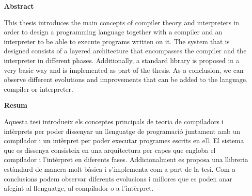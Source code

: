 {}
\centerline{\textbf{Abstract}}
This thesis introduces the main concepts of compiler theory and interpreters in order to design a programming language
together with a compiler and an interpreter to be able to execute programs written on it.
The system that is designed consists of a layered architecture that encompasses the compiler and the interpreter in different phases.
Additionally, a standard library is proposed in a very basic way and is implemented as part of the thesis.
As a conclusion, we can observe different evolutions and improvements that can be added to the language, compiler or interpreter.
\vfill
{}
{}
\centerline{\textbf{Resum}}
Aquesta tesi introdueix els conceptes principals de teoria de compiladors i intèrprets per poder dissenyar un llenguatge de programació
juntament amb un compilador i un intèrpret per poder executar programes escrits en ell.
El sistema que es dissenya consisteix en una arquitectura per capes que engloba el compilador i l'intèrpret en diferents fases.
Addicionalment es proposa una llibreria estàndard de manera molt bàsica i s'implementa com a part de la tesi.
Com a conclusions podem observar diferents evolucions i millores que es poden anar afegint al llenguatge, al compilador o a l'intèrpret.
